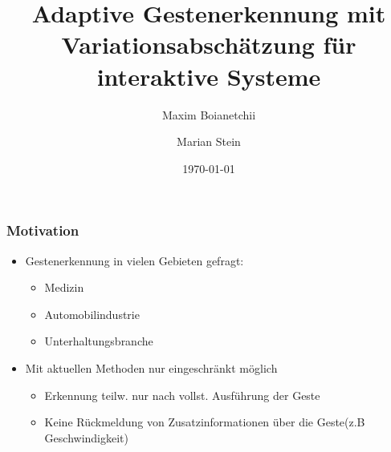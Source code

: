 \documentclass{beamer}
\begin{document}
\title[Adaptive Gestenerkennung]{Adaptive Gestenerkennung mit Variationsabschätzung für interaktive Systeme}
\author{Maxim Boianetchii \and Marian Stein}
\date{\today}

\begin{frame}
\titlepage
\end{frame}

\begin{frame}\frametitle{Motivation}
\begin{itemize}
\item Gestenerkennung in vielen Gebieten gefragt:
\begin{itemize}
\item Medizin
\item Automobilindustrie
\item Unterhaltungsbranche
\end{itemize}
\item Mit aktuellen Methoden nur eingeschränkt möglich
\begin{itemize}
\item Erkennung teilw. nur nach vollst. Ausführung der Geste
\item Keine Rückmeldung von Zusatzinformationen über die Geste(z.B Geschwindigkeit)




\end{itemize}
\end{itemize}
\end{frame}
\end{document}
